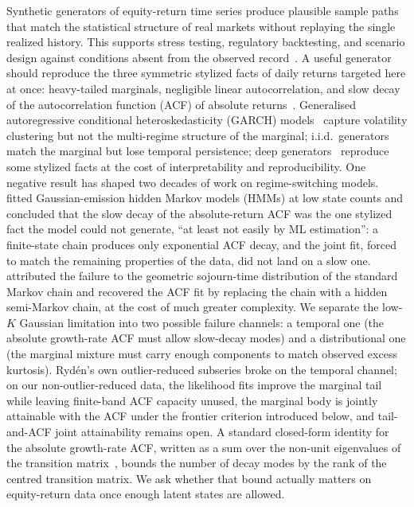 Synthetic generators of equity-return time series produce plausible sample paths that match the statistical structure of real markets without replaying the single realized history. This supports stress testing, regulatory backtesting, and scenario design against conditions absent from the observed record~\cite{jordon2022synthetic, assefa2020generating, alswaidan2026hybrid}. A useful generator should reproduce the three symmetric stylized facts of daily returns targeted here at once: heavy-tailed marginals, negligible linear autocorrelation, and slow decay of the autocorrelation function (ACF) of absolute returns~\cite{mandelbrot1963variation, cont2001empirical}. Generalised autoregressive conditional heteroskedasticity (GARCH) models~\cite{engle1982autoregressive, bollerslev1986generalized} capture volatility clustering but not the multi-regime structure of the marginal; i.i.d.\ generators~\cite{efron1979bootstrap} match the marginal but lose temporal persistence; deep generators~\cite{yoon2019timegan, wiese2020quantgan, rasul2021autoregressive} reproduce some stylized facts at the cost of interpretability and reproducibility. One negative result has shaped two decades of work on regime-switching models. \citet{ryden1998stylized} fitted Gaussian-emission hidden Markov models (HMMs) at low state counts and concluded that the slow decay of the absolute-return ACF was the one stylized fact the model could not generate, ``at least not easily by ML estimation'': a finite-state chain produces only exponential ACF decay, and the joint fit, forced to match the remaining properties of the data, did not land on a slow one. \citet{bulla2006stylized} attributed the failure to the geometric sojourn-time distribution of the standard Markov chain and recovered the ACF fit by replacing the chain with a hidden semi-Markov chain, at the cost of much greater complexity. We separate the low-$K$ Gaussian limitation into two possible failure channels: a temporal one (the absolute growth-rate ACF must allow slow-decay modes) and a distributional one (the marginal mixture must carry enough components to match observed excess kurtosis). Ryd\'{e}n's own outlier-reduced subseries broke on the temporal channel; on our non-outlier-reduced data, the likelihood fits improve the marginal tail while leaving finite-band ACF capacity unused, the marginal body is jointly attainable with the ACF under the frontier criterion introduced below, and tail-and-ACF joint attainability remains open. A standard closed-form identity for the absolute growth-rate ACF, written as a sum over the non-unit eigenvalues of the transition matrix~\cite{hamilton1994time, krolzig1997markov, timmermann2000moments}, bounds the number of decay modes by the rank of the centred transition matrix. We ask whether that bound actually matters on equity-return data once enough latent states are allowed.


